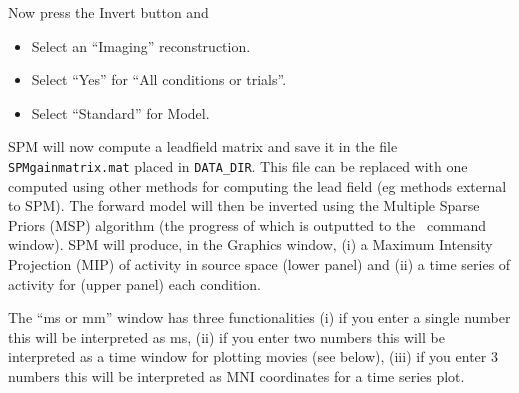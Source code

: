 Now press the Invert button and
\begin{itemize}
\item{Select an ``Imaging'' reconstruction.}
\item{Select ``Yes'' for ``All conditions or trials''.}
\item{Select ``Standard'' for Model.}
\end{itemize}
SPM will now compute a leadfield matrix and save it in the file \texttt{SPMgainmatrix.mat} placed in \texttt{DATA\_DIR}. This file can be replaced with one computed using other methods for computing the lead field (eg methods external to SPM). The forward model will then be inverted using the Multiple Sparse Priors (MSP) algorithm (the progress of which is outputted to the \matlab\ command window). SPM will produce, in the Graphics window, (i) a Maximum Intensity Projection (MIP) of activity in source space (lower panel) and (ii) a time series of activity for (upper panel) each condition.

The ``ms or mm'' window has three functionalities (i) if you enter a single number this will be interpreted as ms, (ii) if you enter two numbers this will be interpreted as a time window for plotting movies (see below), (iii) if you enter 3 numbers this will be interpreted as MNI coordinates for a time series plot.

